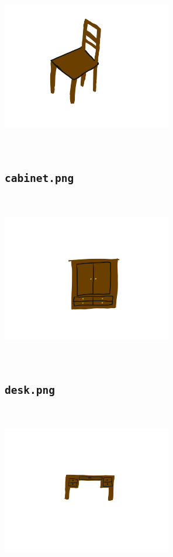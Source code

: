 \documentclass[american,extrafontsizes,12pt,portrait,letterpaper,oneside,onecolumn,final]{memoir}
\begin{document}
\includegraphics[keepaspectratio=true,width=20em,height=20em]{product_Images/chair.png}

\subsection{\texorpdfstring{\texttt{cabinet.png}}{\texttt{cabinet.png}}}

\includegraphics[keepaspectratio=true,width=20em,height=20em]{product_Images/cabinet.png}

\subsection{\texorpdfstring{\texttt{desk.png}}{\texttt{desk.png}}}

\includegraphics[keepaspectratio=true,width=20em,height=20em]{product_Images/desk.png}
\end{document}
